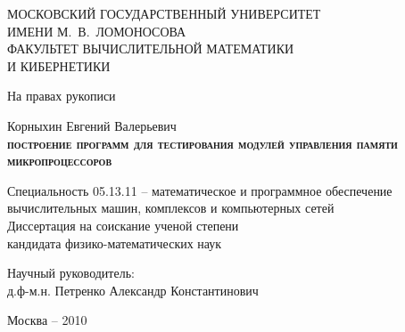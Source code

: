 \documentclass[14pt]{extreport}
\begin{document}
\thispagestyle{empty}

\begin{singlespace}
\begin{center}
%
МОСКОВСКИЙ ГОСУДАРСТВЕННЫЙ УНИВЕРСИТЕТ\\ ИМЕНИ М.~В.~ЛОМОНОСОВА\\[0.5cm]

ФАКУЛЬТЕТ ВЫЧИСЛИТЕЛЬНОЙ МАТЕМАТИКИ\\ И КИБЕРНЕТИКИ\\[1cm]
\end{center}

\begin{flushright}
На правах рукописи\\[2cm]
\end{flushright}

\begin{center}
Корныхин Евгений Валерьевич\\[1cm]
\textbf{%
\huge{%
\textsc{построение программ
для тестирования
модулей управления памяти микропроцессоров}}\\[0.5cm]}

Специальность 05.13.11 -- математическое и программное обеспечение
вычислительных машин, комплексов и компьютерных сетей\\[1.5cm]


Диссертация на соискание ученой степени\\
кандидата физико-математических наук
\end{center}

\vspace{0.7cm}

\begin{flushright} Научный руководитель:\\
д.ф-м.н. Петренко Александр Константинович
\end{flushright}

\vspace{1.5cm}

\begin{center}
Москва -- 2010
\end{center}


\end{singlespace}
\end{document}

